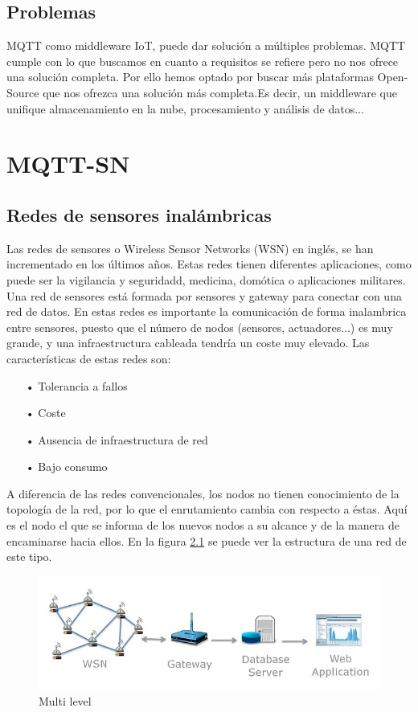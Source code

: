 \documentclass[12pt, twoside]{book}
\begin{document}
\section{Problemas}
MQTT como middleware IoT, puede dar solución a múltiples problemas. MQTT cumple con lo que buscamos en cuanto a requisitos se refiere pero no nos ofrece una solución completa. Por ello hemos optado por buscar más plataformas Open-Source que nos ofrezca una solución más completa.Es decir, un middleware que unifique almacenamiento en la nube, procesamiento y análisis de datos...


\chapter{MQTT-SN}
\section{Redes de sensores inalámbricas}
Las redes de sensores o Wireless Sensor Networks (WSN) en inglés, se han incrementado en los últimos años. Estas redes tienen diferentes aplicaciones, como puede ser la vigilancia y seguridadd, medicina, domótica o aplicaciones militares. Una red de sensores está formada por sensores y gateway para conectar con una red de datos. En estas redes es importante la comunicación de forma inalambrica entre sensores, puesto que el número de nodos (sensores, actuadores...) es muy grande, y una infraestructura cableada tendría un coste muy elevado. Las características de estas redes son:
\begin{itemize}
\item[•]Tolerancia a fallos\\
\item[•]Coste\\
\item[•]Ausencia de infraestructura de red\\
\item[•]Bajo consumo
\end{itemize} 
A diferencia de las redes convencionales, los nodos no tienen conocimiento de la topología de la red, por lo que el enrutamiento cambia con respecto a éstas. Aquí es el nodo el que se informa de los nuevos nodos a su alcance y de la manera de encaminarse hacia ellos. En la figura \ref{L411} se puede ver la estructura de una red de este tipo.
\begin{figure}[H]
\centering
\includegraphics[scale=0.5]{images/wsn}
\caption{Multi level}\label{L411}
\end{figure}
 
\end{document}
